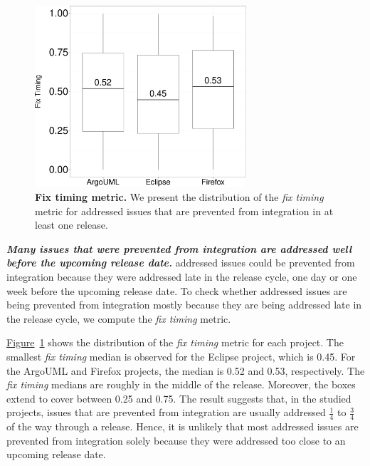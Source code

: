 \begin{figure}[!t]
	\centering
	\includegraphics[width=0.7\textwidth]
	{chapters/chapter4/figures/addressing_stage.pdf}
	\caption{\textbf{Fix timing metric.} We present the
		distribution of the \textit{fix timing} metric for addressed
		issues that are prevented from integration in at least one release.}
	\label{ch4:fig:boxplotTimeWindow}
\end{figure}

\noindent\textit{\textbf{Many issues that were prevented from integration are
addressed well before the upcoming release date.}} addressed issues could be prevented
from integration because they were addressed late in the release cycle, \eg one day
or one week before the upcoming release date. To check whether addressed issues are
being prevented from integration mostly because they are being addressed late in the
release cycle, we compute the \textit{fix timing} metric. 

\hyperref[ch4:fig:boxplotTimeWindow]{Figure}~\ref{ch4:fig:boxplotTimeWindow} shows the
distribution of the \textit{fix timing} metric for each project. The smallest
\textit{fix timing} median is observed for the Eclipse project, which is 0.45.
For the ArgoUML and Firefox projects, the median is 0.52 and 0.53, respectively.
The \textit{fix timing} medians are roughly in the middle of the release.
Moreover, the boxes extend to cover between 0.25 and 0.75. The result suggests
that, in the studied projects, issues that are prevented from integration are
usually addressed $\frac{1}{4}$ to $\frac{3}{4}$ of the way through a release.
Hence, it is unlikely that most addressed issues are prevented from integration
solely because they were addressed too close to an upcoming release date.




